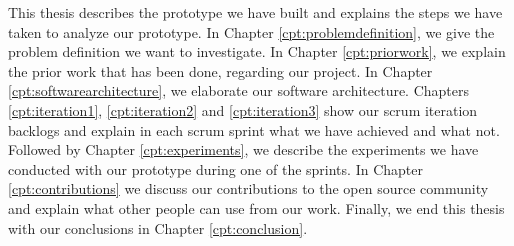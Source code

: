 This thesis describes the prototype we have built and explains the steps we have taken to analyze our prototype. In Chapter \ref{cpt:problemdefinition}, we give the problem definition we want to investigate. In Chapter \ref{cpt:priorwork}, we explain the prior work that has been done, regarding our project. In Chapter \ref{cpt:softwarearchitecture}, we elaborate our software architecture. Chapters \ref{cpt:iteration1}, \ref{cpt:iteration2} and \ref{cpt:iteration3} show our scrum iteration backlogs and explain in each scrum sprint what we have achieved and what not. Followed by Chapter \ref{cpt:experiments}, we describe the experiments we have conducted with our prototype during one of the sprints. In Chapter \ref{cpt:contributions} we discuss our contributions to the open source community and explain what other people can use from our work. Finally, we end this thesis with our conclusions in Chapter \ref{cpt:conclusion}.